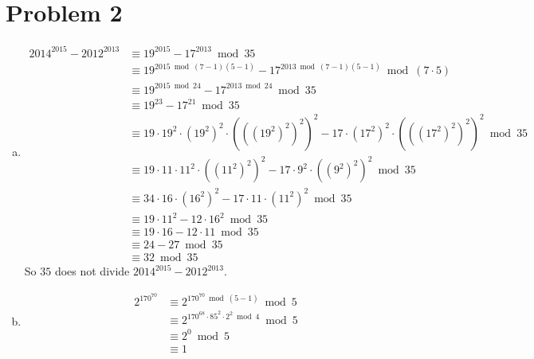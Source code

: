 \documentclass[11pt]{article}
\newcounter{problemnumber}
\begin{document}
\section*{Problem 2}
\begin{enumerate}[(a)]
\item \begin{align*}
2014^{2015}-2012^{2013} &\equiv 19^{2015}-17^{2013} \bmod 35 \\
&\equiv 19^{2015\bmod(7-1)(5-1)}-17^{2013\bmod(7-1)(5-1)} \bmod (7\cdot 5) \\
&\equiv 19^{2015 \bmod 24}-17^{2013 \bmod 24} \bmod 35 \\
&\equiv 19^{23}-17^{21} \bmod 35 \\
&\equiv 19\cdot 19^2\cdot (19^2)^2\cdot (((19^2)^2)^2)^2 - 17\cdot (17^2)^2\cdot (((17^2)^2)^2)^2 \bmod 35 \\
&\equiv 19\cdot 11\cdot 11^2\cdot ((11^2)^2)^2 - 17\cdot 9^2\cdot ((9^2)^2)^2 \bmod 35 \\
&\equiv 34\cdot 16\cdot (16^2)^2 - 17\cdot 11\cdot (11^2)^2 \bmod 35 \\
&\equiv 19\cdot 11^2 - 12\cdot 16^2 \bmod 35 \\
&\equiv 19\cdot 16 - 12\cdot 11 \bmod 35 \\
&\equiv 24 - 27 \bmod 35 \\
&\equiv 32 \bmod 35
\end{align*}
So $35$ does not divide $2014^{2015}-2012^{2013}$.
\item \begin{align*}
2^{170^{70}} &\equiv 2^{170^{70} \bmod (5-1)} \bmod 5 \\
&\equiv 2^{170^{68}\cdot 85^2 \cdot 2^2 \bmod 4} \bmod 5 \\
&\equiv 2^0 \bmod 5 \\
&\equiv 1
\end{align*}
\end{enumerate}


\newpage
\end{document}
